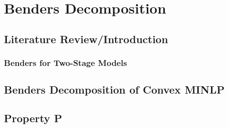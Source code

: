 \chapter{Benders Decomposition}

\section{Literature Review/Introduction}

\subsection{Benders for Two-Stage Models}

\section{Benders Decomposition of Convex MINLP}

\section{Property P}

